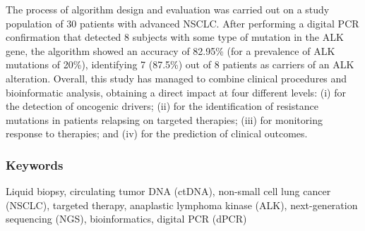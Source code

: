 The process of algorithm design and evaluation was carried out on a study population of 30 patients with advanced NSCLC. After performing a digital PCR confirmation that detected 8 subjects with some type of mutation in the ALK gene, the algorithm showed an accuracy of 82.95\% (for a prevalence of ALK mutations of 20\%), identifying 7 (87.5\%) out of 8 patients as carriers of an ALK alteration. 
Overall, this study has managed to combine clinical procedures and bioinformatic analysis, obtaining a direct impact at four different levels: (i) for the detection of oncogenic drivers; (ii) for the identification of resistance mutations in patients relapsing on targeted therapies; (iii) for monitoring response to therapies; and (iv) for the prediction of clinical outcomes.

\subsubsection*{Keywords}

\footnotesize
Liquid biopsy, circulating tumor DNA (ctDNA), non-small cell lung cancer (NSCLC), targeted therapy, anaplastic lymphoma kinase (ALK), next-generation sequencing (NGS), bioinformatics, digital PCR (dPCR)
\normalsize



